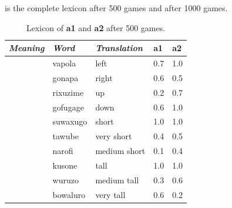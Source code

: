  is the complete lexicon after 500 games and  after 1000 games. 
\begin{table}
\begin{center}
\begin{tabular}{ l  l  l  l  l } \midrule
{\it Meaning}&{\it Word}&{\it Translation} & {\bf a1}&{\bf a2} \\ \midrule
[HPOS 0.0-0.5]&vapola&left &0.7&1.0\\ \midrule
[HPOS 0.5-1.0]&gonapa&right &0.6&0.5\\ \midrule
[VPOS 0.0-0.5]&rixuzime& up & 0.2&0.7\\ \midrule
[VPOS 0.5-1.0]&gofugage& down &0.6&1.0\\ \midrule
[HEIGHT 0.0-0.5]&suwaxugo&short & 1.0&1.0\\ \midrule
 [HEIGHT 0.0-0.25]&tawube&very short & 0.4&0.5\\ \midrule
 [HEIGHT 0.25-0.5]&narofi&medium short&0.1&0.4\\ \midrule
[HEIGHT 0.5-1.0]&kusone&tall&1.0&1.0\\ \midrule
 [HEIGHT 0.5-0.75]&wuruzo&medium tall&0.3&0.6\\ \midrule
 [HEIGHT 0.75-1.0]&bowaluro&very tall&0.6&0.2\\ \midrule
\end{tabular}
\caption{\label{tab:lex500a} Lexicon of {\bf a1} and {\bf a2} after 500 games.}
\end{center}
\end{table}

